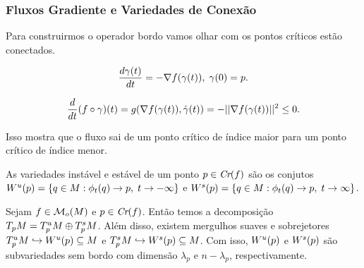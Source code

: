 \documentclass{beamer}
\begin{document}
	\begin{frame}
		
		\frametitle{Fluxos Gradiente e Variedades de Conexão}
		\begin{tiny}
			Para construirmos o operador bordo vamos olhar com os pontos críticos estão conectados.
		\end{tiny}
		
		\begin{definicao}
				$$
				\frac{d \gamma(t)}{d t} = -\nabla f(\gamma(t)), \; \gamma(0) = p.
				$$
		\end{definicao}
		
		$$
		\frac{d }{d t}(f \circ \gamma)(t) = g(\nabla f(\gamma(t)), \dot{\gamma}(t)) 
		=-||\nabla f(\gamma(t))||^{2}
		\leq 0.
		$$
		\begin{tiny}
			Isso mostra que o fluxo sai de um ponto crítico de 
			índice maior para um ponto crítico de índice menor.
		\end{tiny}
		
		\pause
		\begin{definicao}
			As variedades instável e estável de um ponto $p \in \textit{Cr}(f)$ são os conjutos $W^{u}(p) = \{q\in M: \phi_{t}(q) \to p,\; t\to -\infty\}$ e $W^{s}(p) = \{q\in M: \phi_{t}(q) \to p,\; t\to \infty\}$.
		\end{definicao}
		
	\end{frame}
	
	\begin{frame}
		
		\begin{teorema}
			Sejam $f \in \mathcal{M}_{o}(M)$ e $p \in \textit{Cr}(f)$. Então temos a decomposição $T_{p}M=T^{u}_{p}M\oplus T^{s}_{p}M$. Além disso, existem mergulhos suaves e sobrejetores $T^{u}_{p}M \hookrightarrow W^{u}(p) \subseteq M$ e $T^{s}_{p}M \hookrightarrow W^{s}(p) \subseteq M$. Com isso, $W^{u}(p)$ e $W^{s}(p)$ são subvariedades sem bordo com dimensão $\lambda_{p}$ e $n-\lambda_{p}$, respectivamente.
		\end{teorema}
		
	\end{frame}
	
\end{document}

